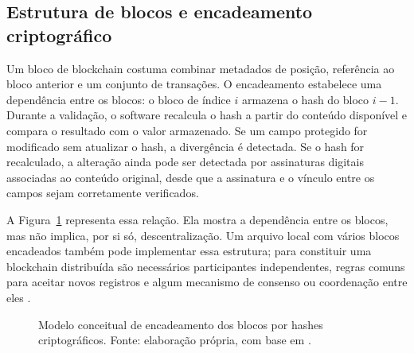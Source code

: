 \documentclass[10pt,a4paper,twocolumn]{article}
\begin{document}
\subsection{Estrutura de blocos e encadeamento criptográfico}
Um bloco de blockchain costuma combinar metadados de posição, referência ao bloco anterior e um conjunto de transações. O encadeamento estabelece uma dependência entre os blocos: o bloco de índice $i$ armazena o hash do bloco $i-1$. Durante a validação, o software recalcula o hash a partir do conteúdo disponível e compara o resultado com o valor armazenado. Se um campo protegido for modificado sem atualizar o hash, a divergência é detectada. Se o hash for recalculado, a alteração ainda pode ser detectada por assinaturas digitais associadas ao conteúdo original, desde que a assinatura e o vínculo entre os campos sejam corretamente verificados.

A Figura~\ref{fig:encadeamento} representa essa relação. Ela mostra a dependência entre os blocos, mas não implica, por si só, descentralização. Um arquivo local com vários blocos encadeados também pode implementar essa estrutura; para constituir uma blockchain distribuída são necessários participantes independentes, regras comuns para aceitar novos registros e algum mecanismo de consenso ou coordenação entre eles \cite{Yaga2018,Zheng2017}.

\begin{figure}[t]
\centering
{}
\caption{Modelo conceitual de encadeamento dos blocos por hashes criptográficos. Fonte: elaboração própria, com base em \cite{Nakamoto2008,Yaga2018}.}
\label{fig:encadeamento}
\end{figure}
\end{document}

